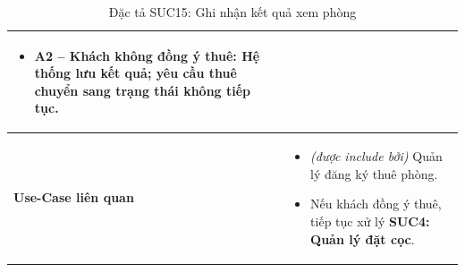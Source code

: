 \begin{table}[H]
\begin{tabularx}{\textwidth}{|>{\centering\arraybackslash\bfseries}m{3.5cm}|X|}
\begin{itemize}[leftmargin=*, nosep, label=-]
        \item \textbf{A2 -- Khách không đồng ý thuê:} Hệ thống lưu kết quả; yêu cầu thuê chuyển sang trạng thái không tiếp tục.
    \end{itemize} \\
    \hline
    Use-Case liên quan &
    \begin{itemize}[leftmargin=*, nosep, label=-]
        \vspace{0.1cm}
        \item \textit{(được include bởi)} Quản lý đăng ký thuê phòng.
        \item Nếu khách đồng ý thuê, tiếp tục xử lý \textbf{SUC4: Quản lý đặt cọc}.
\end{itemize} \\
    \hline
\end{tabularx}
\caption{Đặc tả SUC15: Ghi nhận kết quả xem phòng}
\end{table}



\vspace{1cm}

